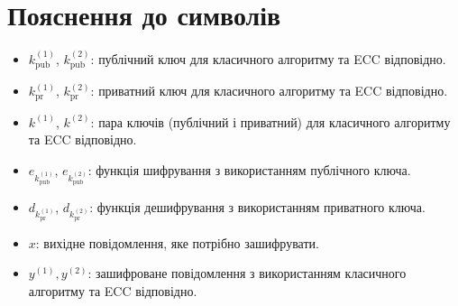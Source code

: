 \documentclass[12pt]{report}
\begin{document}
\section*{Пояснення до символів}
\begin{itemize}
    \item $k_{\text{pub}}^{(1)}$, $k_{\text{pub}}^{(2)}$: публічний ключ для класичного алгоритму та ECC відповідно.
    \item $k_{\text{pr}}^{(1)}$, $k_{\text{pr}}^{(2)}$: приватний ключ для класичного алгоритму та ECC відповідно.
    \item $k^{(1)}$, $k^{(2)}$: пара ключів (публічний і приватний) для класичного алгоритму та ECC відповідно.
    \item $e_{k_{\text{pub}}^{(1)}}$, $e_{k_{\text{pub}}^{(2)}}$: функція шифрування з використанням публічного ключа.
    \item $d_{k_{\text{pr}}^{(1)}}$, $d_{k_{\text{pr}}^{(2)}}$: функція дешифрування з використанням приватного ключа.
    \item $x$: вихідне повідомлення, яке потрібно зашифрувати.
    \item $y^{(1)}, y^{(2)}$: зашифроване повідомлення з використанням класичного алгоритму та ECC відповідно.
\end{itemize}
\end{document}
